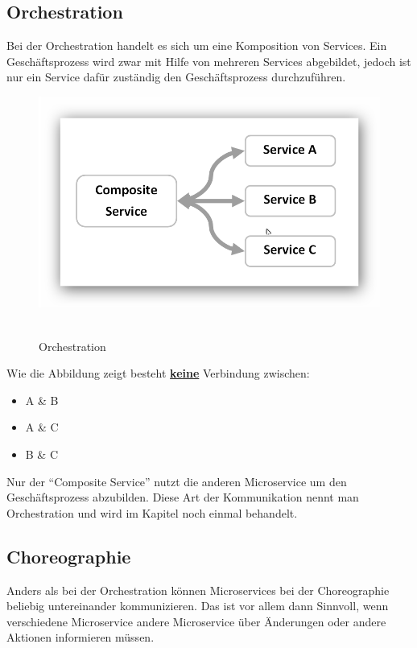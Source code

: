 \subsection{Orchestration}
\label{subsec:orchestration}
Bei der Orchestration handelt es sich um eine Komposition von Services. Ein Geschäftsprozess wird zwar mit Hilfe von mehreren Services abgebildet, jedoch ist nur ein Service dafür zuständig den Geschäftsprozess durchzuführen.
\newpage
\begin{figure}[htb]
    \centering 
    \includegraphics[width=\linewidth]{content/images/ServiceOrchestration}\
    \caption[Orchestration]{Orchestration}
    \label{fig:ServiceOrchestration}  
\end{figure}
\noindent
Wie die Abbildung zeigt besteht \textbf{\underline{keine}} Verbindung zwischen:
\begin{itemize}
    \item A \& B
    \item A \& C
    \item B \& C
\end{itemize}
Nur der "`Composite Service"' nutzt die anderen Microservice um den Geschäftsprozess abzubilden. Diese Art der Kommunikation nennt man Orchestration und wird im Kapitel  noch einmal behandelt.

\subsection{Choreographie}
\label{subsec:choreographie}
Anders als bei der Orchestration können Microservices bei der Choreographie beliebig untereinander kommunizieren. Das ist vor allem dann Sinnvoll, wenn verschiedene Microservice andere Microservice über Änderungen oder andere Aktionen informieren müssen.

